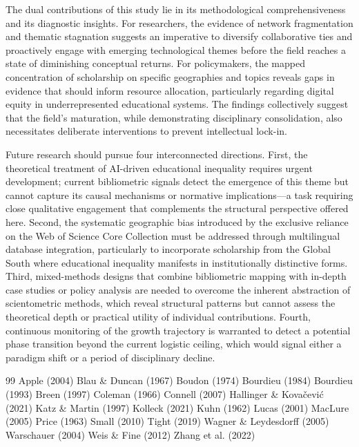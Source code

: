 \documentclass[12pt,a4paper]{article}
\begin{document}
The dual contributions of this study lie in its methodological comprehensiveness and its diagnostic insights. For researchers, the evidence of network fragmentation and thematic stagnation suggests an imperative to diversify collaborative ties and proactively engage with emerging technological themes before the field reaches a state of diminishing conceptual returns. For policymakers, the mapped concentration of scholarship on specific geographies and topics reveals gaps in evidence that should inform resource allocation, particularly regarding digital equity in underrepresented educational systems. The findings collectively suggest that the field’s maturation, while demonstrating disciplinary consolidation, also necessitates deliberate interventions to prevent intellectual lock-in.

Future research should pursue four interconnected directions. First, the theoretical treatment of AI-driven educational inequality requires urgent development; current bibliometric signals detect the emergence of this theme but cannot capture its causal mechanisms or normative implications—a task requiring close qualitative engagement that complements the structural perspective offered here. Second, the systematic geographic bias introduced by the exclusive reliance on the Web of Science Core Collection must be addressed through multilingual database integration, particularly to incorporate scholarship from the Global South where educational inequality manifests in institutionally distinctive forms. Third, mixed-methods designs that combine bibliometric mapping with in-depth case studies or policy analysis are needed to overcome the inherent abstraction of scientometric methods, which reveal structural patterns but cannot assess the theoretical depth or practical utility of individual contributions. Fourth, continuous monitoring of the growth trajectory is warranted to detect a potential phase transition beyond the current logistic ceiling, which would signal either a paradigm shift or a period of disciplinary decline.

\begin{thebibliography}{99}
 Apple (2004)
 Blau \& Duncan (1967)
 Boudon (1974)
 Bourdieu (1984)
 Bourdieu (1993)
 Breen (1997)
 Coleman (1966)
 Connell (2007)
 Hallinger \& Kovačević (2021)
 Katz \& Martin (1997)
 Kolleck (2021)
 Kuhn (1962)
 Lucas (2001)
 MacLure (2005)
 Price (1963)
 Small (2010)
 Tight (2019)
 Wagner \& Leydesdorff (2005)
 Warschauer (2004)
 Weis \& Fine (2012)
 Zhang et al. (2022)
\end{thebibliography}
\end{document}
